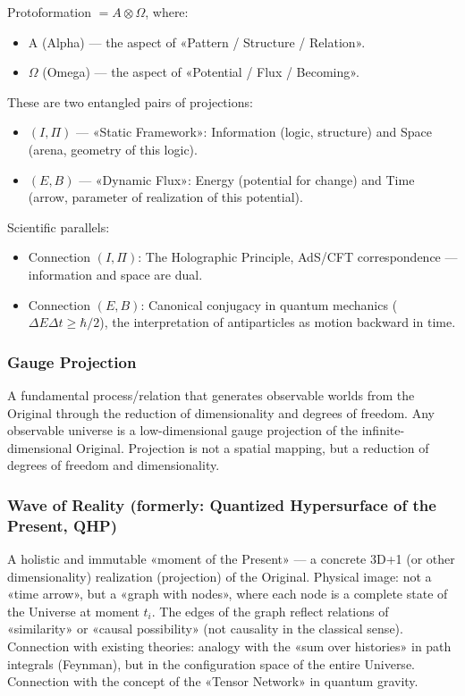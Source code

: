 \documentclass[a4paper,12pt]{article}
\begin{document}
	Protoformation $= A \otimes \Omega$, where:
	\begin{itemize}
		\item A (Alpha) — the aspect of «Pattern / Structure / Relation».
		\item $\Omega$ (Omega) — the aspect of «Potential / Flux / Becoming».
	\end{itemize}
	
	These are two entangled pairs of projections:
	\begin{itemize}
		\item $(I, \Pi)$ — «Static Framework»: Information (logic, structure) and Space (arena, geometry of this logic).
		\item $(E, B)$ — «Dynamic Flux»: Energy (potential for change) and Time (arrow, parameter of realization of this potential).
	\end{itemize}
	
	Scientific parallels:
	\begin{itemize}
		\item Connection $(I, \Pi)$: The Holographic Principle, AdS/CFT correspondence — information and space are dual.
		\item Connection $(E, B)$: Canonical conjugacy in quantum mechanics ($\Delta E \Delta t \geq \hbar/2$), the interpretation of antiparticles as motion backward in time.
	\end{itemize}
	
	\subsubsection{Gauge Projection}
	
	A fundamental process/relation that generates observable worlds from the Original through the reduction of dimensionality and degrees of freedom. Any observable universe is a low-dimensional gauge projection of the infinite-dimensional Original. Projection is not a spatial mapping, but a reduction of degrees of freedom and dimensionality.
	
	\subsubsection{Wave of Reality (formerly: Quantized Hypersurface of the Present, QHP)}
	
	A holistic and immutable «moment of the Present» — a concrete 3D+1 (or other dimensionality) realization (projection) of the Original. Physical image: not a «time arrow», but a «graph with nodes», where each node is a complete state of the Universe at moment $t_i$. The edges of the graph reflect relations of «similarity» or «causal possibility» (not causality in the classical sense). Connection with existing theories: analogy with the «sum over histories» in path integrals (Feynman), but in the configuration space of the entire Universe. Connection with the concept of the «Tensor Network» in quantum gravity.
	
\end{document}
